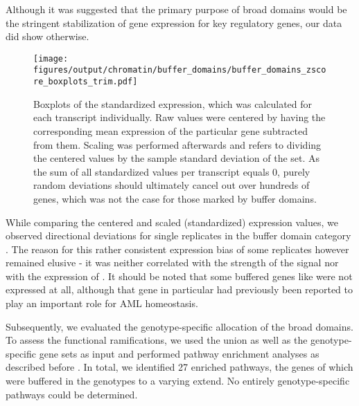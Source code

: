 Although it was suggested that the primary purpose of broad \hisfourthree domains would be the stringent stabilization of gene expression for key regulatory genes\cite{Benayoun2014}, our data did show otherwise.

\begin{figure}[!bht]
	\centering
	\texttt{[image: figures/output/chromatin/buffer\_domains/buffer\_domains\_zscore\_boxplots\_trim.pdf]} 
	\caption{Boxplots of the standardized expression, which was calculated for each transcript individually. Raw values were centered by having the corresponding mean expression of the particular gene subtracted from them. Scaling was performed afterwards and refers to dividing the centered values by the sample standard deviation of the set. As the sum of all standardized values per transcript equals \num{0}, purely random deviations should ultimately cancel out over hundreds of genes, which was not the case for those marked by buffer domains.} 
	\label{fig:genes:buffer_domains_zscore_boxplots}
\end{figure}

While comparing the centered and scaled (standardized) expression values, we observed directional deviations for single replicates in the buffer domain category . The reason for this rather consistent expression bias of some replicates however remained elusive - it was neither correlated with the strength of the \hisfourthree signal \dns nor with the expression of \cite{Wong2015}. It should be noted that some buffered genes like  were not expressed at all, although that gene in particular had previously been reported to play an important role for AML homeostasis\cite{Somerville2015}. 

Subsequently, we evaluated the genotype-specific allocation of the broad \hisfourthree domains. To assess the functional ramifications, we used the union as well as the genotype-specific gene sets as input and performed  pathway enrichment analyses as described before . In total, we identified \num{27} enriched pathways, the genes of which were buffered in the genotypes to a varying extend. No entirely genotype-specific pathways could be determined. 

